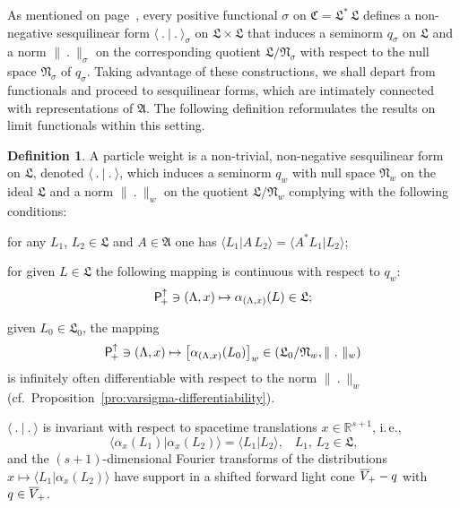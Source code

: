 \documentclass[a4paper,a4paper]{article}
\numberwithin{equation}{section}
\newcommand{\Afrak}{\mathfrak{A}}
\newcommand{\Cfrak}{\mathfrak{C}}
\newcommand{\Lfrak}{\mathfrak{L}}
\newcommand{\Nfrak}{\mathfrak{N}}
\newcommand{\Rsone}{\mathbb{R}^{s + 1}}
\newcommand{\Poin}{\mathsf{P}_{\negthinspace +}^\uparrow}
\newcommand{\fwcone}{\overline{V}_{\negthinspace +}}
\newcommand{\aLax}{\alpha_{( \Lambda , x )}}
\newcommand{\ax}{\alpha_x}
\newcounter{propitem}
\newenvironment{proplist}{\begin{list}{(\roman{propitem})}%
  {\usecounter{propitem} \setlength{\topsep}{0ex}%
   \setlength{\parsep}{0.2ex} \setlength{\itemsep}{0.4ex}%
   \setlength{\leftmargin}{0em} \setlength{\itemindent}{0.5em}%
   }}{\end{list}}
\theoremstyle{definition}
\newtheorem{definition}{Definition}[section]
\theoremstyle{plain}
\theoremstyle{remark}
\newcommand{\norm}[1]{\lVert #1 \rVert}
\newcommand{\qw}{q_w}
\newcommand{\scp}[2]{\langle #1 \vert #2 \rangle}
\newcommand{\bscp}[2]{\bigl\langle #1 \big\vert #2 \bigr\rangle}
\begin{document}
  As mentioned on page~\pageref{eq:varsigma-quotient-constructions},
  every positive functional $\sigma$ on $\Cfrak = \Lfrak^* \, \Lfrak$
  defines a non-negative sesquilinear form $\scp{~.~}{~.~}_\sigma$ on
  $\Lfrak \times \Lfrak$ that induces a seminorm $q_\sigma$ on
  $\Lfrak$ and a norm $\norm{~.~}_\sigma$ on the corresponding
  quotient $\Lfrak / \Nfrak_\sigma$ with respect to the null space
  $\Nfrak_\sigma$ of $q_\sigma$. Taking advantage of these
  constructions, we shall depart from functionals and proceed to
  sesquilinear forms, which are intimately connected with
  representations of $\Afrak$. The following definition reformulates
  the results on limit functionals within this setting.
  \begin{definition}
    \label{def:particle-weight}
    A particle weight is a non-trivial, non-negative sesquilinear form
    on $\Lfrak$, denoted $\scp{~.~}{~.~}$, which induces a seminorm
    $q_w$ with null space $\Nfrak_w$ on the ideal $\Lfrak$ and a norm
    $\norm{~.~}_w$ on the quotient $\Lfrak / \Nfrak_w$ complying with
    the following conditions:
    \begin{proplist}
    \item for any $L_1$, $L_2 \in \Lfrak$ and $A \in \Afrak$ one has
      $\scp{L_1}{A \, L_2} = \scp{A^* L_1}{L_2}$;
    \item for given $L \in \Lfrak$ the following mapping is continuous
      with respect to $\qw$:
      \begin{equation*}
        \Poin \ni ( \Lambda , x ) \mapsto \aLax ( L ) \in \Lfrak
        \text{;}
      \end{equation*}
    \item given $L_0 \in \Lfrak_0$, the mapping
      \begin{equation*}
        \Poin \ni ( \Lambda , x ) \mapsto \bigl[ \aLax ( L_0 )
        \bigr]_w \in ( \Lfrak_0 / \Nfrak_w , \norm{~.~}_w )
      \end{equation*}
      is infinitely often differentiable with respect to the norm
      $\norm{~.~}_w$
      (cf.~Proposition~\ref{pro:varsigma-differentiability}).
    \item $\scp{~.~}{~.~}$ is invariant with respect to spacetime
      translations $x \in \Rsone$, i.\,e.,
      \begin{equation*}
        \bscp{\ax ( L_1 )}{\ax ( L_2 )} = \scp{L_1}{L_2} \text{,}
        \quad L_1 \text{, } L_2 \in \Lfrak \text{,}
      \end{equation*}
      and the $(s + 1)$-dimensional Fourier transforms of the
      distributions $x \mapsto \bscp{L_1}{\ax ( L_2 )}$ have support
      in a shifted forward light cone $\fwcone - q$ with $q \in
      \fwcone$.
    \end{proplist}
  \end{definition}
\end{document}
